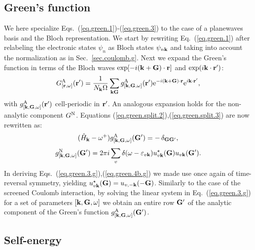 \documentclass[twocolumn,prb,showpacs,superscriptaddress]{revtex4}
\def\w{\omega}
\def\H{\hat{H}}
\def\E{\varepsilon}
\def\k{{\bf k}}
\def\G{{\bf G}}
\def\Gp{{\bf G^\prime}}
\def\r{{\bf r}}
\def\rp{{\bf r^\prime}}
\begin{document}
\subsection{Green's function}\label{sec.green.g}

We here specialize Eqs.\ (\ref{eq.green.1})-(\ref{eq.green.3}) to the case
of a planewaves basis and the Bloch representation.
We start by rewriting Eq.\ (\ref{eq.green.1}) after relabeling the electronic states
$\psi_n$ as Bloch states $\psi_{n\k}$ and taking into account the
normalization as in Sec.\ \ref{sec.coulomb.g}.
Next we expand the Green's function in terms
of the Bloch waves ${\rm exp}[-i(\k+\G)\cdot\r]$ and ${\rm exp}(i\k\cdot\rp)$:
  \begin{equation}\label{eq.green.bloch}
  G^{\rm A}_{[\r,\w]} (\rp) = \frac{1}{N_\k\Omega}  \sum_{\k\G} g^{\rm A}_{[\k,\G,\w]}(\rp)
   {\rm e}^{-i(\k+\G)\cdot\r} {\rm e}^{i\k\cdot\rp},
  \end{equation}
with $g^{\rm A}_{[\k,\G,\w]}(\rp)$ cell-periodic in $\rp$. An analogous expansion
holds for the non-analytic component $G^{\rm N}$.
Equations (\ref{eq.green.split.2}),(\ref{eq.green.split.3}) are now rewritten as:
  \begin{equation}\label{eq.green.3.g}
   (\H_\k-\w^+)  g^{\rm A}_{[\k,\G,\w]}(\Gp)  =  -\,\delta_{\G\Gp},
  \end{equation}
  \begin{equation} \label{eq.green.4b.g}
  g^{\rm N}_{[\k,\G,\w]}(\Gp)  =  
  2\pi i \sum_v \delta(\w-\E_{v\k}) u^\star_{v\k}(\G)u_{v\k} (\Gp).
  \end{equation}
In deriving Eqs.\ (\ref{eq.green.3.g}),(\ref{eq.green.4b.g}) we made use once again
of time-reversal symmetry, yielding
$u^\star_{v\k}(\G) = u_{v,-\k}(-\G)$.
Similarly to the case of the screened Coulomb interaction, by solving the
linear system in Eq.\ (\ref{eq.green.3.g}) for a set of parameters $[\k,\G,\w]$ 
we obtain an entire row $\Gp$ of the analytic component of the
Green's function $g^{\rm A}_{[\k,\G,\w]}(\Gp)$.

\subsection{Self-energy}\label{sec.sigma.g}
\end{document}
